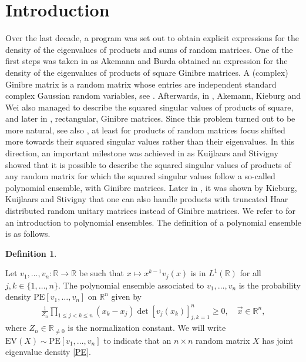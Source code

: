 \documentclass[a4paper,12pt,oneside]{article}
\theoremstyle{definition}
\newtheorem{defi}{Definition}[section]
\newcommand{\R}{\mathbb{R}}
\begin{document}
\section{Introduction}
Over the last decade, a program was set out to obtain explicit expressions for the density of the eigenvalues of products and sums of random matrices. One of the first steps was taken in \cite{AB:prod_Gin} as Akemann and Burda obtained an expression for the density of the eigenvalues of products of square Ginibre matrices. A (complex) Ginibre matrix is a random matrix whose entries are independent standard complex Gaussian random variables, see \cite{Gin}. Afterwards, in \cite{AKW:prod_sq_Gin}, Akemann, Kieburg and Wei also managed to describe the squared singular values of products of square, and later in \cite{AIK:prod_rec_Gin}, rectangular, Ginibre matrices. Since this problem turned out to be more natural, see also \cite{KZ:prod_gin}, at least for products of random matrices focus shifted more towards their squared singular values rather than their eigenvalues. In this direction, an important milestone was achieved in \cite{KS:gin_prod} as Kuijlaars and Stivigny showed that it is possible to describe the squared singular values of products of any random matrix for which the squared singular values follow a so-called polynomial ensemble, with Ginibre matrices. Later in \cite{KKS:trunc_prod}, it was shown by Kieburg, Kuijlaars and Stivigny that one can also handle products with truncated Haar distributed random unitary matrices instead of Ginibre matrices. We refer to \cite{K:transf_PE} for an introduction to polynomial ensembles. The definition of a polynomial ensemble is as follows.

\begin{defi} \label{def_PE_full_}

Let $v_1,\dots,v_n:\R\to\R$ be such that $x\mapsto x^{k-1} v_j(x)$ is in $L^1(\R)$ for all $j,k\in\{1,\dots,n\}$. The polynomial ensemble associated to $v_1,\dots,v_n$ is the probability density $\text{PE}[v_1,\dots,v_n]$ on $\R^n$ given by
\begin{align} \label{PE}
    \frac{1}{Z_n} \prod_{1\leq j<k\leq n} (x_k-x_j) \det[v_j(x_k)]_{j,k=1}^{n} \geq 0,\quad \vec{x}\in\R^n,
\end{align}
where $Z_n\in\R_{\neq 0}$ is the normalization constant. We will write $\text{EV}(X)\sim\text{PE}[v_1,\dots,v_n]$ to indicate that an $n\times n$ random matrix $X$ has joint eigenvalue density \eqref{PE}.
\end{defi}
\end{document}
